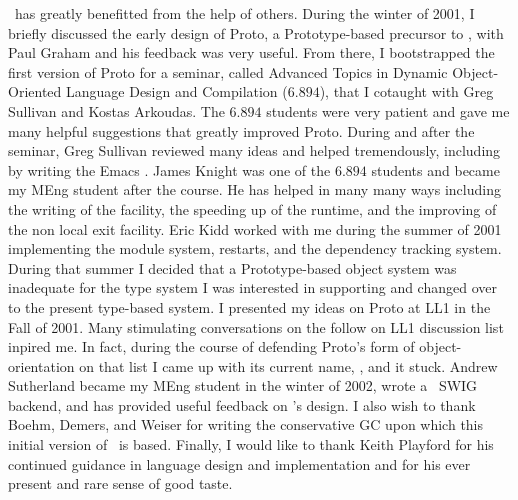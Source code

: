 \documentclass[twoside,twocolumn,9pt]{extarticle}
\begin{document}
\goo\ has greatly benefitted from the help of others.  During the
winter of 2001, I briefly discussed the early design of Proto, a
Prototype-based precursor to \goo, with Paul Graham and his feedback
was very useful.  From there, I bootstrapped the first version of
Proto for a seminar, called Advanced Topics in Dynamic Object-Oriented
Language Design and Compilation ($6.894$), that I cotaught with Greg
Sullivan and Kostas Arkoudas.  The $6.894$ students were very patient
and gave me many helpful suggestions that greatly improved Proto.
During and after the seminar, Greg Sullivan reviewed many ideas and
helped tremendously, including by writing the Emacs .  
James Knight was one of the $6.894$ students and
became my MEng student after the course.  He has helped in many many
ways including the writing of the  facility, the
speeding up of the runtime, and the improving of the non local exit
facility.  Eric Kidd worked with me during the summer of 2001
implementing the module system, restarts, and the dependency tracking
system.  During that summer I decided that a Prototype-based object
system was inadequate for the type system I was interested in
supporting and changed over to the present type-based system.  I
presented my ideas on Proto at LL1 in the Fall of 2001.  Many
stimulating conversations on the follow on LL1 discussion list inpired
me.  In fact, during the course of defending Proto's form of
object-orientation on that list I came up with its current name, \goo,
and it stuck.  Andrew Sutherland became my MEng student in the winter
of 2002, wrote a \goo\ SWIG~\cite{Beaz96a} backend, and has provided
useful feedback on \goo's design.  I also wish to thank Boehm, Demers,
and Weiser for writing the conservative GC upon which this initial
version of \goo\ is based.  Finally, I would like to thank
Keith Playford for his continued guidance in language design and
implementation and for his ever present and rare sense of good taste.

% 
% 
% 
% 
\end{document}
